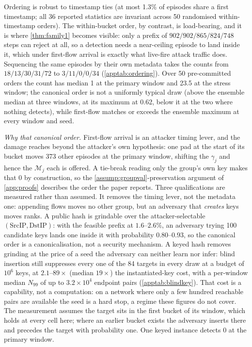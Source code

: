 \documentclass[conference]{IEEEtran}
\begin{document}
Ordering is robust to timestamp ties (at most 1.3\% of episodes share a first timestamp; all 36 reported
statistics are invariant across 50 randomised within-timestamp orders). The within-bucket order, by
contrast, is load-bearing, and it is where \cref{thm:family1} becomes visible: only a prefix of
$902/902/865/824/748$ steps can reject at all, so a detection needs a near-ceiling episode to land inside
it, which under first-flow arrival is exactly what live-fire attack traffic does. Sequencing the same
episodes by their own metadata takes the counts from $18/13/30/31/72$ to $3/11/0/0/34$
(\cref{apptab:ordering}). Over 50 pre-committed orders the count has median 1 at the primary window and
23.5 at the stress window; the canonical order is not a uniformly typical draw (above the ensemble median
at three windows, at its maximum at 0.62, below it at the two where nothing detects), while first-flow
matches or exceeds the ensemble maximum at every window and seed.

\emph{Why that canonical order.} First-flow arrival is an attacker timing lever, and the damage reaches
beyond the attacker's own hypothesis: one pad at the start of its bucket moves 373 other episodes at the primary
window, shifting the $\gamma_j$ and hence the $\mathcal M_j$ each is offered. A tie-break reading only the
group's own key makes that 0 by construction, so the \cref{assump:groupval}-preservation argument of
\cref{app:proofs} describes the order the paper reports. Three qualifications are measured rather than
assumed. It removes the timing lever, not the metadata one: appending flows moves no other group, but an
adversary that \emph{creates} keys moves ranks. A public hash is grindable over the attacker-selectable
$(\mathrm{SrcIP},\mathrm{DstIP})$: with the feasible prefix at $1.6$--$2.6\%$, an adversary trying 100
candidate keys lands one inside it with probability $0.80$--$0.93$, so the canonical order is a
canonicalisation, not a security mechanism. A keyed hash removes grinding at the price of a seed the
adversary can neither learn nor infer: blind insertion still suppresses every one of the 84 targets in
every draw at a budget of $10^{6}$ keys, at $2.1$--$89\times$ (median $19\times$) the instantiated-key
cost, with a per-window median $N_{99}$ of up to $3.2\times10^{4}$ endpoint pairs
(\cref{apptab:blindkey}). That cost is a
capability, not a computation: on a network where only a few hundred reachable pairs are available the
seed is a hard stop, a regime these figures do not cover. The measurement assumes the target sits in the
first bucket of its window, which holds at every cell here; where an earlier bucket exists the adversary
inserts there and precedes the target with probability one. One keyed instance detects 0 at the primary
window.
\end{document}

